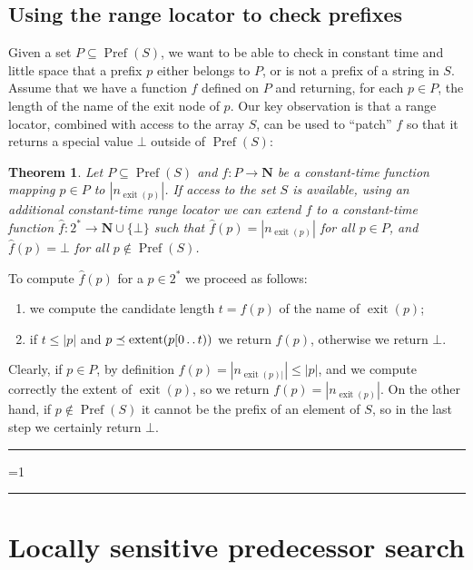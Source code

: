 \documentclass{article}
\newtheorem{theorem}{Theorem}
\newcounter{noqed}
\newcommand{\qed}{ \ifmmode\mbox{ }\fi\rule[-.05em]{.3em}{.7em}\setcounter{noqed}{0}}
\newenvironment{proof}[1][{}]{\noindent{\bf Proof#1. }\setcounter{noqed}{1}}{\ifnum\value{noqed}=1\qed\fi\par\medskip}
\newcommand{\exit}[1]{\operatorname{exit}(#1)}
\newcommand{\Pref}[1]{\operatorname{Pref}(#1)}
\newcommand{\N}{\mathbf N}
\newcommand{\?}{\mskip1.5mu}
\newcommand{\extent}{\operatorname{extent}}
\def\..{\,\mathpunct{\ldotp\ldotp}} %
\begin{document}
\subsection{Using the range locator to check prefixes}

Given a set $P\subseteq \Pref S$, we want to be able to check in constant time
and little space that a prefix $p$ either belongs to $P$, or is not a prefix of a string in $S$. Assume that we have a function $f$ 
defined on $P$ and returning, for each $p\in P$, the length of the name of the exit node of $p$. 
Our key observation is that a range locator, combined with access to the array $S$, can be used to ``patch''
$f$ so that it returns a special value $\bot$ outside of $\Pref S$:
\begin{theorem}
\label{th:pref}
Let $P\subseteq\Pref S$ and $f: P\to \N$ be a constant-time function mapping
$p\in P$ to $|n_{\exit p}|$. If access to the set $S$ is available, using an additional
constant-time range locator we can extend $f$ to a constant-time function $\hat f:2^*\to \N
\cup\{\bot\}$ such that $\hat f(p)=|n_{\exit p}|$ for all $p \in P$, and $\hat f(p)=\bot$ for
all $p \not\in\Pref S$.
\end{theorem}
\begin{proof}
To compute $\hat f(p)$ for a $p\in 2^*$ we proceed as follows:
\begin{enumerate}
  \item we compute the candidate length $t=f(p)$ of the name of $\exit p$;
  \item if $t\leq |p|$ and $p\preceq \extent(p[0\..t))$ we return $f(p)$,
  otherwise we return $\bot$.
\end{enumerate}
Clearly, if $p\in P$, by definition $f(p)=|n_{\exit p|}|\leq |p|$, and we
compute correctly the extent of $\exit p$, so we return $f(p)=|n_{\exit p}|$.
On the other hand, if $p \not\in \Pref S$ it cannot be the prefix of an element
of $S$, so in the last step we certainly return $\bot$.
\qed
\end{proof}


\section{Locally sensitive predecessor search}
\label{sec:pred}
\end{document}
